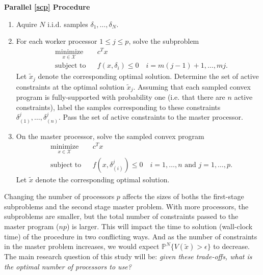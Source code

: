 \documentclass[12pt]{article}
\begin{document}
\bigskip
\textbf{Parallel \ref{scp} Procedure}
\begin{enumerate}
\item Aquire $N$ i.i.d. samples $\delta_1, \ldots, \delta_N$.

\item For each worker processor $1 \leq j \leq p$, solve the subproblem
\begin{equation*}
\begin{aligned}
    & \underset{x \in \mathcal{X}}{\text{minimize}}
    & & c^T x \\
    & \text{subject to}
    & & f(x,\delta_i) \leq 0 \quad i = m(j-1) + 1, \ldots, mj.
\end{aligned}
\end{equation*}
Let $\tilde{x}_j$ denote the corresponding optimal solution.
Determine the set of active constraints at the optimal solution $\tilde{x}_j$.
Assuming that each sampled convex program is fully-supported with probability one (i.e. that there are $n$ active constraints),
label the samples corresponding to these constraints $\delta_{(1)}^j, \ldots, \delta_{(n)}^j$.
Pass the set of active constraints to the master processor.

\item On the master processor, solve the sampled convex program
\begin{equation*}
\begin{aligned}
    & \underset{x \in \mathcal{X}}{\text{minimize}}
    & & c^T x \\
    & \text{subject to}
    & & f(x,\delta_{(i)}^j) \leq 0 \quad i = 1,\ldots,n \text{ and } j = 1,\ldots,p.
\end{aligned}
\end{equation*}
Let $\tilde{x}$ denote the corresponding optimal solution.
\end{enumerate}

Changing the number of processors $p$ affects the sizes of boths the first-stage subproblems and the second stage master problem.
With more processors, the subproblems are smaller, but the total number of constraints passed to the master program ($np$) is larger.
This will impact the time to solution (wall-clock time) of the procedure in two conflicting ways.
And as the number of constraints in the master problem increases, we would expect $\mathbb{P}^N\{V(\tilde{x}) > \epsilon\}$ to decrease.
The main research question of this study will be: \textit{given these trade-offs, what is the optimal number of processors to use?}
\end{document}
